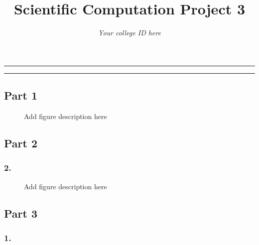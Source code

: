 \documentclass{article}
\title{Scientific Computation Project 3}
\author{\emph{Your college ID here}}
\begin{document}
\maketitle

\hrule
\hrule

\subsection*{Part 1}

\begin{figure}[h!]
\centering

\caption{Add figure description here}
\label{fig1}
\end{figure}


\vspace{0.25in}

\subsection*{Part 2}

\subsubsection*{2.}


\begin{figure}[h!]
\centering

\caption{Add figure description here}
\label{fig2}
\end{figure}

\subsection*{Part 3}

\subsubsection*{1.}
\end{document}
